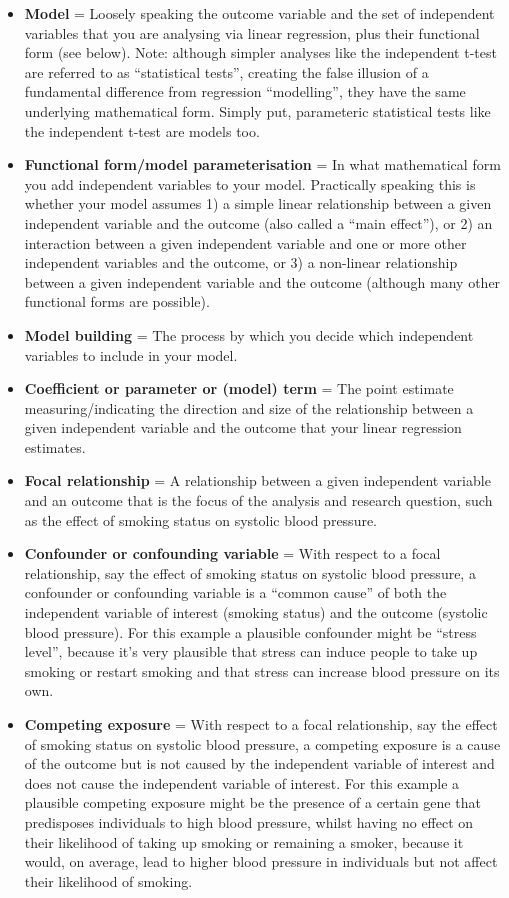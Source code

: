 \documentclass[
]{book}
\begin{document}
\begin{itemize}
\item
  \textbf{Model} = Loosely speaking the outcome variable and the set of independent variables that you are analysing via linear regression, plus their functional form (see below). Note: although simpler analyses like the independent t-test are referred to as ``statistical tests'', creating the false illusion of a fundamental difference from regression ``modelling'', they have the same underlying mathematical form. Simply put, parameteric statistical tests like the independent t-test are models too.
\item
  \textbf{Functional form/model parameterisation} = In what mathematical form you add independent variables to your model. Practically speaking this is whether your model assumes 1) a simple linear relationship between a given independent variable and the outcome (also called a ``main effect''), or 2) an interaction between a given independent variable and one or more other independent variables and the outcome, or 3) a non-linear relationship between a given independent variable and the outcome (although many other functional forms are possible).
\item
  \textbf{Model building} = The process by which you decide which independent variables to include in your model.
\item
  \textbf{Coefficient or parameter or (model) term} = The point estimate measuring/indicating the direction and size of the relationship between a given independent variable and the outcome that your linear regression estimates.
\item
  \textbf{Focal relationship} = A relationship between a given independent variable and an outcome that is the focus of the analysis and research question, such as the effect of smoking status on systolic blood pressure.
\item
  \textbf{Confounder or confounding variable} = With respect to a focal relationship, say the effect of smoking status on systolic blood pressure, a confounder or confounding variable is a ``common cause'' of both the independent variable of interest (smoking status) and the outcome (systolic blood pressure). For this example a plausible confounder might be ``stress level'', because it's very plausible that stress can induce people to take up smoking or restart smoking and that stress can increase blood pressure on its own.
\item
  \textbf{Competing exposure} = With respect to a focal relationship, say the effect of smoking status on systolic blood pressure, a competing exposure is a cause of the outcome but is not caused by the independent variable of interest and does not cause the independent variable of interest. For this example a plausible competing exposure might be the presence of a certain gene that predisposes individuals to high blood pressure, whilst having no effect on their likelihood of taking up smoking or remaining a smoker, because it would, on average, lead to higher blood pressure in individuals but not affect their likelihood of smoking.

\end{itemize}
\end{document}

